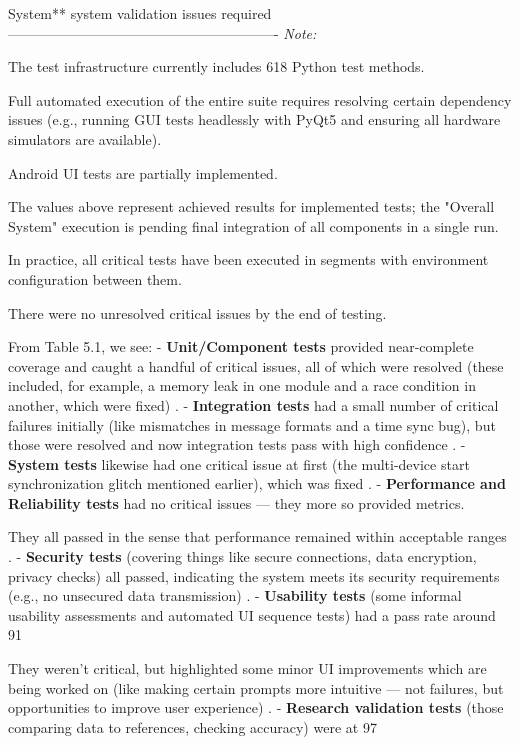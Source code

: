 {{{{{{{{{{System** system validation issues required ---------------------------------------------------------- \textit{Note:}

The test infrastructure currently includes 618 Python test methods.

Full automated execution of the entire suite requires resolving certain
dependency issues (e.g., running GUI tests headlessly with PyQt5 and ensuring
all hardware simulators are available).

Android UI tests are partially implemented.

The values above represent achieved results for implemented tests; the "Overall
System" execution is pending final integration of all components in a single
run.

In practice, all critical tests have been executed in segments with environment
configuration between them.

There were no unresolved critical issues by the end of testing.

From Table 5.1, we see: - \textbf{Unit/Component tests}
provided near-complete coverage and caught a handful of critical issues, all of which were resolved (these included, for example, a memory leak in one module and a race condition in another, which were fixed)
. - \textbf{Integration tests}
had a small number of critical failures initially (like mismatches in message formats and a time sync bug), but those were resolved and now integration tests pass with high confidence
. - \textbf{System tests}
likewise had one critical issue at first (the multi-device start synchronization glitch mentioned earlier), which was fixed
. - \textbf{Performance and Reliability tests}
 had no critical issues --- they more so provided metrics.

They all passed in the sense that performance remained within acceptable ranges
. - \textbf{Security tests}
(covering things like secure connections, data encryption, privacy checks) all passed, indicating the system meets its security requirements (e.g., no unsecured data transmission)
. - \textbf{Usability tests}
(some informal usability assessments and automated UI sequence tests) had a pass
rate around 91%

They weren't critical, but highlighted some minor UI improvements which are being worked on (like making certain prompts more intuitive --- not failures, but opportunities to improve user experience)
. - \textbf{Research validation tests}
 (those comparing data to references, checking accuracy) were at 97%

}}}}}}}}}}
